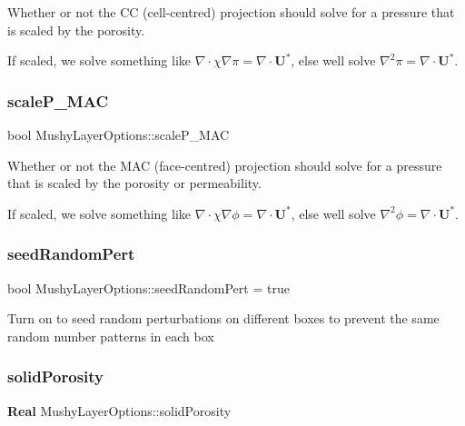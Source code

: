 Whether or not the CC (cell-\/centred) projection should solve for a pressure that is scaled by the porosity. 

If scaled, we solve something like $ \nabla \cdot \chi \nabla \pi = \nabla \cdot \mathbf{U}^* $, else we\textquotesingle{}ll solve $ \nabla^2 \pi = \nabla \cdot \mathbf{U}^* $. \mbox{\label{struct_mushy_layer_options_acabfc7dcbcac5cb973e9478101e3768d}} 
\subsubsection{\texorpdfstring{scale\+P\+\_\+\+M\+AC}{scaleP\_MAC}}
{\footnotesize\ttfamily bool Mushy\+Layer\+Options\+::scale\+P\+\_\+\+M\+AC}



Whether or not the M\+AC (face-\/centred) projection should solve for a pressure that is scaled by the porosity or permeability. 

If scaled, we solve something like $ \nabla \cdot \chi \nabla \phi = \nabla \cdot \mathbf{U}^* $, else we\textquotesingle{}ll solve $ \nabla^2 \phi = \nabla \cdot \mathbf{U}^* $. \mbox{\label{struct_mushy_layer_options_ad38c7a08b2061d98daa9507b9b65877e}} 
\subsubsection{\texorpdfstring{seed\+Random\+Pert}{seedRandomPert}}
{\footnotesize\ttfamily bool Mushy\+Layer\+Options\+::seed\+Random\+Pert = true}

Turn on to seed random perturbations on different boxes to prevent the same \textquotesingle{}random\textquotesingle{} number patterns in each box \mbox{\label{struct_mushy_layer_options_a437d5973f3095fbaf98c98b017e393ed}} 
\subsubsection{\texorpdfstring{solid\+Porosity}{solidPorosity}}
{\footnotesize\ttfamily \textbf{ Real} Mushy\+Layer\+Options\+::solid\+Porosity}



